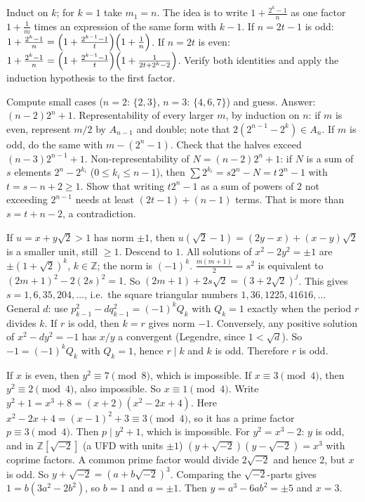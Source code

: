\documentclass[11pt,a4paper]{article}
\begin{document}
 Induct on $k$; for $k=1$ take $m_1=n$. The idea is to write $1+\frac{2^k-1}n$ as one factor $1+\frac1m$ times an expression of the same form with $k-1$.
 If $n=2t-1$ is odd: $1+\frac{2^k-1}{n}=\Bigl(1+\frac{2^{k-1}-1}{t}\Bigr)\Bigl(1+\frac1{n}\Bigr)$.
 If $n=2t$ is even: $1+\frac{2^k-1}{n}=\Bigl(1+\frac{2^{k-1}-1}{t}\Bigr)\Bigl(1+\frac1{2t+2^k-2}\Bigr)$. Verify both identities and apply the induction hypothesis to the first factor.

 Compute small cases ($n=2$: $\{2,3\}$, $n=3$: $\{4,6,7\}$) and guess. Answer: $(n-2)2^n+1$.
 Representability of every larger $m$, by induction on $n$: if $m$ is even, represent $m/2$ by $A_{n-1}$ and double; note that $2(2^{n-1}-2^k)\in A_n$. If $m$ is odd, do the same with $m-(2^n-1)$. Check that the halves exceed $(n-3)2^{n-1}+1$.
 Non-representability of $N=(n-2)2^n+1$: if $N$ is a sum of $s$ elements $2^n-2^{k_i}$ ($0\le k_i\le n-1$), then $\sum2^{k_i}=s2^n-N=t\,2^n-1$ with $t=s-n+2\ge1$. Show that writing $t2^n-1$ as a sum of powers of $2$ not exceeding $2^{n-1}$ needs at least $(2t-1)+(n-1)$ terms. That is more than $s=t+n-2$, a contradiction.

 If $u=x+y\sqrt2>1$ has norm $\pm1$, then $u(\sqrt2-1)=(2y-x)+(x-y)\sqrt2$ is a smaller unit, still $\ge1$. Descend to $1$. All solutions of $x^2-2y^2=\pm1$ are $\pm(1+\sqrt2)^k$, $k\in\mathbb Z$; the norm is $(-1)^k$.
 $\frac{m(m+1)}2=s^2$ is equivalent to $(2m+1)^2-2(2s)^2=1$. So $(2m+1)+2s\sqrt2=(3+2\sqrt2)^j$. This gives $s=1,6,35,204,\dots$, i.e.\ the square triangular numbers $1,36,1225,41616,\dots$
 General $d$: use $p_{k-1}^2-dq_{k-1}^2=(-1)^kQ_k$ with $Q_k=1$ exactly when the period $r$ divides $k$. If $r$ is odd, then $k=r$ gives norm $-1$.
 Conversely, any positive solution of $x^2-dy^2=-1$ has $x/y$ a convergent (Legendre, since $1<\sqrt d$). So $-1=(-1)^kQ_k$ with $Q_k=1$, hence $r\mid k$ and $k$ is odd. Therefore $r$ is odd.

 If $x$ is even, then $y^2\equiv7\pmod8$, which is impossible. If $x\equiv3\pmod4$, then $y^2\equiv2\pmod4$, also impossible. So $x\equiv1\pmod4$.
 Write $y^2+1=x^3+8=(x+2)(x^2-2x+4)$. Here $x^2-2x+4=(x-1)^2+3\equiv3\pmod4$, so it has a prime factor $p\equiv3\pmod4$. Then $p\mid y^2+1$, which is impossible.
 For $y^2=x^3-2$: $y$ is odd, and in $\mathbb Z[\sqrt{-2}]$ (a UFD with units $\pm1$) $(y+\sqrt{-2})(y-\sqrt{-2})=x^3$ with coprime factors. A common prime factor would divide $2\sqrt{-2}$ and hence $2$, but $x$ is odd. So $y+\sqrt{-2}=(a+b\sqrt{-2})^3$.
 Comparing the $\sqrt{-2}$-parts gives $1=b(3a^2-2b^2)$, so $b=1$ and $a=\pm1$. Then $y=a^3-6ab^2=\pm5$ and $x=3$.
\end{document}
